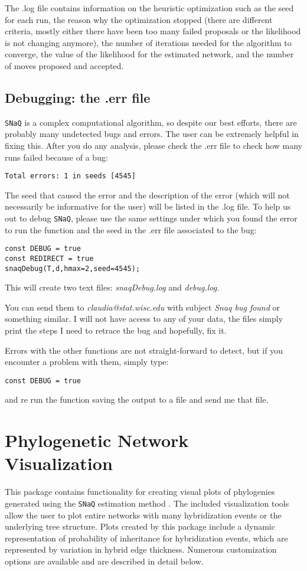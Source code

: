 \documentclass[12pt]{article}
\begin{document}
The .log file contains information on the heuristic optimization
such as the seed for each run, the reason why the optimization stopped
(there are different criteria, mostly either there have been too many
failed proposals or the likelihood is not changing anymore), the
number of iterations needed for the algorithm to converge, the value
of the likelihood for the estimated network, and the
number of moves proposed and accepted.


\subsection{Debugging: the .err file}
\texttt{SNaQ} is a complex computational algorithm, so despite our
best efforts, there are probably many undetected bugs and errors. The
user can be extremely helpful in fixing this.
After you do any analysis, please check the .err file to check how
many runs failed because of a bug:
\begin{lstlisting}
Total errors: 1 in seeds [4545]
\end{lstlisting}

The seed that caused the error and
the description of the error (which will not necessarily be
informative for the user) will be listed in the .log file.
To help us out to debug \texttt{SNaQ}, please use the same settings
under which you found the error to run the function and the seed in
the .err file associated to the bug:
\begin{lstlisting}
const DEBUG = true
const REDIRECT = true
snaqDebug(T,d,hmax=2,seed=4545);
\end{lstlisting}
This will create two text files: \textit{snaqDebug.log} and
\textit{debug.log}.

You can send them to
\textit{claudia@stat.wisc.edu} with subject \textit{Snaq bug found} or
something similar. I
will not have access to any of your data, the files simply print the
steps I need to retrace the bug and hopefully, fix it.

Errors with the other functions are not straight-forward to detect,
but if you encounter a problem with them, simply type:
\begin{lstlisting}
const DEBUG = true
\end{lstlisting}
and re run the function saving the output to a file and send me that
file.

\section{Phylogenetic Network Visualization}
\label{sectPlot}
This package contains functionality for creating visual plots of
phylogenies generated using the \texttt{SNaQ} estimation method \citep{Solis-Lemus2015}.
The included visualization tools allow the user to plot entire networks with many hybridization events or the underlying tree structure.
Plots created by this package include a dynamic representation of probability of inheritance for hybridization events, which are represented by variation in hybrid edge thickness.
Numerous customization options are available and are described in detail below.
\end{document}

